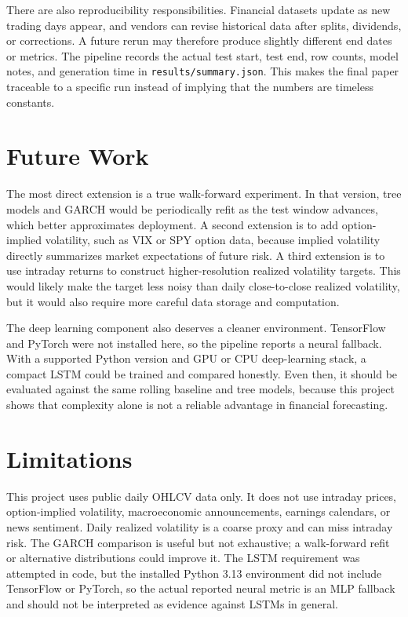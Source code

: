 \documentclass{article}
\begin{document}
There are also reproducibility responsibilities. Financial datasets update as new trading days appear, and vendors can revise historical data after splits, dividends, or corrections. A future rerun may therefore produce slightly different end dates or metrics. The pipeline records the actual test start, test end, row counts, model notes, and generation time in \texttt{results/summary.json}. This makes the final paper traceable to a specific run instead of implying that the numbers are timeless constants.

\section{Future Work}
The most direct extension is a true walk-forward experiment. In that version, tree models and GARCH would be periodically refit as the test window advances, which better approximates deployment. A second extension is to add option-implied volatility, such as VIX or SPY option data, because implied volatility directly summarizes market expectations of future risk. A third extension is to use intraday returns to construct higher-resolution realized volatility targets. This would likely make the target less noisy than daily close-to-close realized volatility, but it would also require more careful data storage and computation.

The deep learning component also deserves a cleaner environment. TensorFlow and PyTorch were not installed here, so the pipeline reports a neural fallback. With a supported Python version and GPU or CPU deep-learning stack, a compact LSTM could be trained and compared honestly. Even then, it should be evaluated against the same rolling baseline and tree models, because this project shows that complexity alone is not a reliable advantage in financial forecasting.

\section{Limitations}
This project uses public daily OHLCV data only. It does not use intraday prices, option-implied volatility, macroeconomic announcements, earnings calendars, or news sentiment. Daily realized volatility is a coarse proxy and can miss intraday risk. The GARCH comparison is useful but not exhaustive; a walk-forward refit or alternative distributions could improve it. The LSTM requirement was attempted in code, but the installed Python 3.13 environment did not include TensorFlow or PyTorch, so the actual reported neural metric is an MLP fallback and should not be interpreted as evidence against LSTMs in general.
\end{document}
